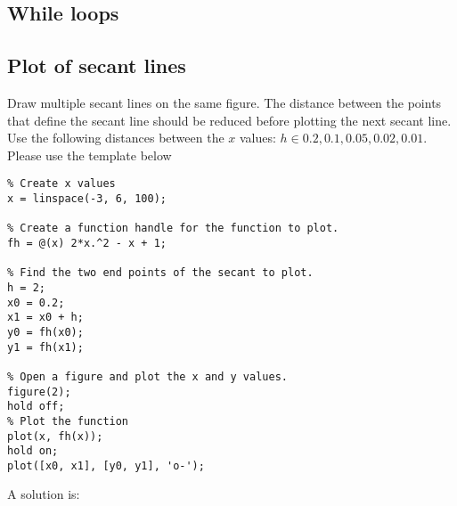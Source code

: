 \subsection{While loops}


\subsection{Plot of secant lines}

\begin{ex}
Draw multiple secant lines on the same figure.
The distance between the points that define the secant line
should be reduced before plotting the next secant line.
Use the following distances between the $x$ values:
$h \in {0.2, 0.1, 0.05, 0.02, 0.01}$.
Please use the template below
\begin{lstlisting}
% Create x values
x = linspace(-3, 6, 100);

% Create a function handle for the function to plot.
fh = @(x) 2*x.^2 - x + 1;

% Find the two end points of the secant to plot.
h = 2;
x0 = 0.2;
x1 = x0 + h;
y0 = fh(x0);
y1 = fh(x1);

% Open a figure and plot the x and y values.
figure(2);
hold off;
% Plot the function
plot(x, fh(x));
hold on;
plot([x0, x1], [y0, y1], 'o-');
\end{lstlisting}
\begin{hint}
\end{hint}
\begin{sol}
A solution is:
\begin{lstlisting}
\end{lstlisting}
\end{sol}
\end{ex}

